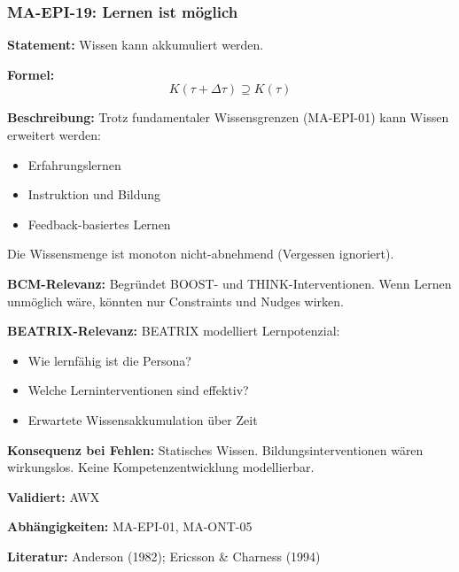 
\subsubsection*{MA-EPI-19: Lernen ist möglich}

\textbf{Statement:} Wissen kann akkumuliert werden.

\textbf{Formel:}
\begin{equation}
K(\tau + \Delta\tau) \supseteq K(\tau)
\end{equation}

\textbf{Beschreibung:}
Trotz fundamentaler Wissensgrenzen (MA-EPI-01) kann Wissen erweitert werden:
\begin{itemize}
    \item Erfahrungslernen
    \item Instruktion und Bildung
    \item Feedback-basiertes Lernen
\end{itemize}
Die Wissensmenge ist monoton nicht-abnehmend (Vergessen ignoriert).

\textbf{BCM-Relevanz:}
Begründet BOOST- und THINK-Interventionen. Wenn Lernen unmöglich wäre, könnten nur Constraints und Nudges wirken.

\textbf{BEATRIX-Relevanz:}
BEATRIX modelliert Lernpotenzial:
\begin{itemize}
    \item Wie lernfähig ist die Persona?
    \item Welche Lerninterventionen sind effektiv?
    \item Erwartete Wissensakkumulation über Zeit
\end{itemize}

\textbf{Konsequenz bei Fehlen:}
Statisches Wissen. Bildungsinterventionen wären wirkungslos. Keine Kompetenzentwicklung modellierbar.

\textbf{Validiert:} AWX

\textbf{Abhängigkeiten:} MA-EPI-01, MA-ONT-05

\textbf{Literatur:} Anderson (1982); Ericsson \& Charness (1994)


